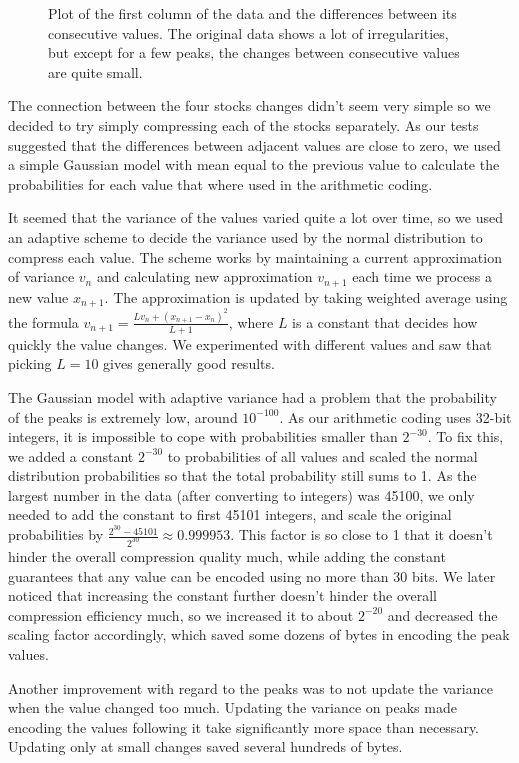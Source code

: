 \documentclass{article}
\begin{document}
\begin{figure}
    \caption{Plot of the first column of the data and the differences between its consecutive values. The original data shows a lot of irregularities, but except for a few peaks, the changes between consecutive values are quite small.}
\end{figure}

The connection between the four stocks changes didn't seem very simple so we decided to try simply compressing each of the stocks separately.
As our tests suggested that the differences between adjacent values are close to zero, we used a simple Gaussian model with mean equal to the previous value to calculate the probabilities for each value that where used in the arithmetic coding.

It seemed that the variance of the values varied quite a lot over time, so we used an adaptive scheme to decide the variance used by the normal distribution to compress each value.
The scheme works by maintaining a current approximation of variance $v_n$ and calculating new approximation $v_{n+1}$ each time we process a new value $x_{n+1}$.
The approximation is updated by taking weighted average using the formula $v_{n+1} = \frac{Lv_n + (x_{n+1}-x_n)^2}{L+1}$, where $L$ is a constant that decides how quickly the value changes.
We experimented with different values and saw that picking $L=10$ gives generally good results.

The Gaussian model with adaptive variance had a problem that the probability of the peaks is extremely low, around $10^{-100}$.
As our arithmetic coding uses 32-bit integers, it is impossible to cope with probabilities smaller than $2^{-30}$.
To fix this, we added a constant $2^{-30}$ to probabilities of all values and scaled the normal distribution probabilities so that the total probability still sums to 1.
As the largest number in the data (after converting to integers) was 45100, we only needed to add the constant to first 45101 integers, and scale the original probabilities by $\frac{2^{30}-45101}{2^{30}} \approx 0.999953$.
This factor is so close to 1 that it doesn't hinder the overall compression quality much, while adding the constant guarantees that any value can be encoded using no more than 30 bits.
We later noticed that increasing the constant further doesn't hinder the overall compression efficiency much, so we increased it to about $2^{-20}$ and decreased the scaling factor accordingly, which saved some dozens of bytes in encoding the peak values.

Another improvement with regard to the peaks was to not update the variance when the value changed too much.
Updating the variance on peaks made encoding the values following it take significantly more space than necessary.
Updating only at small changes saved several hundreds of bytes.
\end{document}
